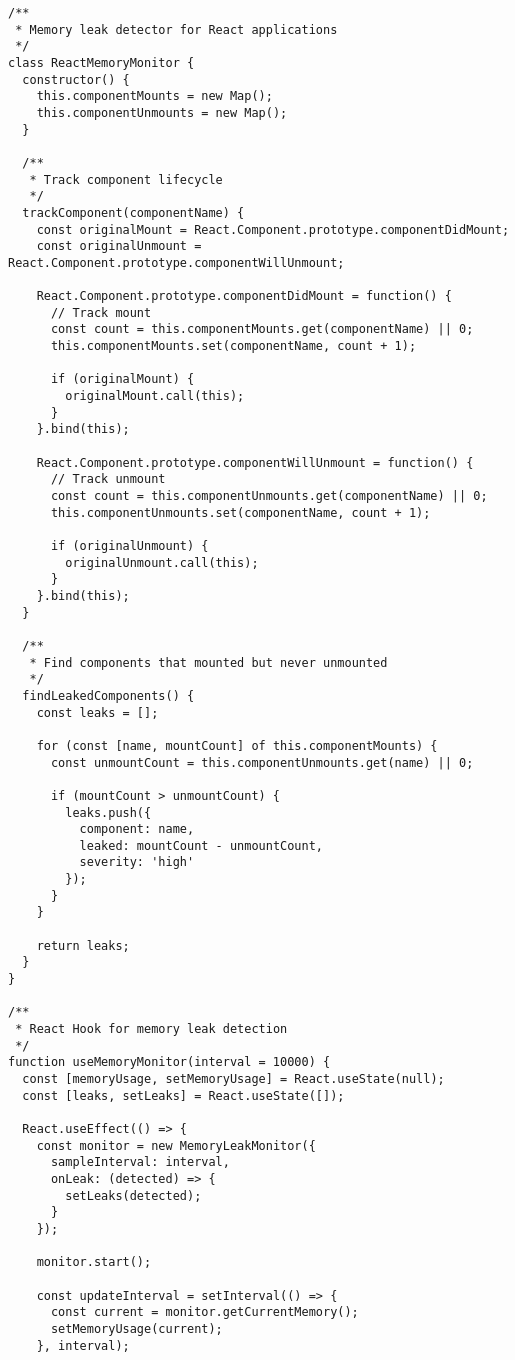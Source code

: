 \documentclass[11pt]{article}
\begin{document}
\begin{verbatim}
/**
 * Memory leak detector for React applications
 */
class ReactMemoryMonitor {
  constructor() {
    this.componentMounts = new Map();
    this.componentUnmounts = new Map();
  }
  
  /**
   * Track component lifecycle
   */
  trackComponent(componentName) {
    const originalMount = React.Component.prototype.componentDidMount;
    const originalUnmount = React.Component.prototype.componentWillUnmount;
    
    React.Component.prototype.componentDidMount = function() {
      // Track mount
      const count = this.componentMounts.get(componentName) || 0;
      this.componentMounts.set(componentName, count + 1);
      
      if (originalMount) {
        originalMount.call(this);
      }
    }.bind(this);
    
    React.Component.prototype.componentWillUnmount = function() {
      // Track unmount
      const count = this.componentUnmounts.get(componentName) || 0;
      this.componentUnmounts.set(componentName, count + 1);
      
      if (originalUnmount) {
        originalUnmount.call(this);
      }
    }.bind(this);
  }
  
  /**
   * Find components that mounted but never unmounted
   */
  findLeakedComponents() {
    const leaks = [];
    
    for (const [name, mountCount] of this.componentMounts) {
      const unmountCount = this.componentUnmounts.get(name) || 0;
      
      if (mountCount > unmountCount) {
        leaks.push({
          component: name,
          leaked: mountCount - unmountCount,
          severity: 'high'
        });
      }
    }
    
    return leaks;
  }
}

/**
 * React Hook for memory leak detection
 */
function useMemoryMonitor(interval = 10000) {
  const [memoryUsage, setMemoryUsage] = React.useState(null);
  const [leaks, setLeaks] = React.useState([]);
  
  React.useEffect(() => {
    const monitor = new MemoryLeakMonitor({
      sampleInterval: interval,
      onLeak: (detected) => {
        setLeaks(detected);
      }
    });
    
    monitor.start();
    
    const updateInterval = setInterval(() => {
      const current = monitor.getCurrentMemory();
      setMemoryUsage(current);
    }, interval);
    

\end{verbatim}
\end{document}
